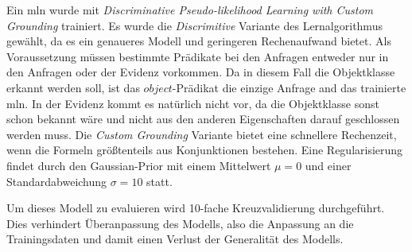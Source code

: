 Ein \gls{mln} wurde mit \textit{Discriminative Pseudo-likelihood Learning with Custom Grounding}   trainiert. Es wurde die \textit{Discrimitive} Variante des Lernalgorithmus gewählt, da es ein genaueres Modell und geringeren Rechenaufwand bietet. Als Voraussetzung müssen bestimmte Prädikate bei den Anfragen entweder nur in den Anfragen oder der Evidenz vorkommen. Da in diesem Fall die Objektklasse erkannt werden soll, ist das $object$-Prädikat die einzige Anfrage and das trainierte \gls{mln}. In der Evidenz kommt es natürlich nicht vor, da die Objektklasse sonst schon bekannt wäre und nicht aus den anderen Eigenschaften darauf geschlossen werden muss. Die \textit{Custom Grounding} Variante bietet eine schnellere Rechenzeit, wenn die Formeln größtenteils aus Konjunktionen bestehen. Eine Regularisierung findet durch den Gaussian-Prior mit einem Mittelwert $\mu = 0$ und einer Standardabweichung $\sigma = 10$ statt. \par   
Um dieses Modell zu evaluieren wird 10-fache Kreuzvalidierung durchgeführt. Dies verhindert Überanpassung des Modells, also die Anpassung an die Trainingsdaten und damit einen Verlust der Generalität des Modells.

